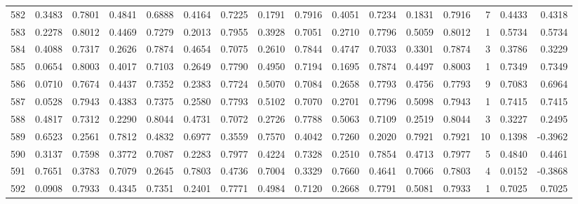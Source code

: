 \begin{tabular}{lrrrrrrrrrrrrrrr}
582 &      0.3483 &  0.7801 &  0.4841 &  0.6888 &  0.4164 &  0.7225 &  0.1791 &  0.7916 &  0.4051 &  0.7234 &   0.1831 &     0.7916 &      7 &                    0.4433 &                     0.4318 \\
583 &      0.2278 &  0.8012 &  0.4469 &  0.7279 &  0.2013 &  0.7955 &  0.3928 &  0.7051 &  0.2710 &  0.7796 &   0.5059 &     0.8012 &      1 &                    0.5734 &                     0.5734 \\
584 &      0.4088 &  0.7317 &  0.2626 &  0.7874 &  0.4654 &  0.7075 &  0.2610 &  0.7844 &  0.4747 &  0.7033 &   0.3301 &     0.7874 &      3 &                    0.3786 &                     0.3229 \\
585 &      0.0654 &  0.8003 &  0.4017 &  0.7103 &  0.2649 &  0.7790 &  0.4950 &  0.7194 &  0.1695 &  0.7874 &   0.4497 &     0.8003 &      1 &                    0.7349 &                     0.7349 \\
586 &      0.0710 &  0.7674 &  0.4437 &  0.7352 &  0.2383 &  0.7724 &  0.5070 &  0.7084 &  0.2658 &  0.7793 &   0.4756 &     0.7793 &      9 &                    0.7083 &                     0.6964 \\
587 &      0.0528 &  0.7943 &  0.4383 &  0.7375 &  0.2580 &  0.7793 &  0.5102 &  0.7070 &  0.2701 &  0.7796 &   0.5098 &     0.7943 &      1 &                    0.7415 &                     0.7415 \\
588 &      0.4817 &  0.7312 &  0.2290 &  0.8044 &  0.4731 &  0.7072 &  0.2726 &  0.7788 &  0.5063 &  0.7109 &   0.2519 &     0.8044 &      3 &                    0.3227 &                     0.2495 \\
589 &      0.6523 &  0.2561 &  0.7812 &  0.4832 &  0.6977 &  0.3559 &  0.7570 &  0.4042 &  0.7260 &  0.2020 &   0.7921 &     0.7921 &     10 &                    0.1398 &                    -0.3962 \\
590 &      0.3137 &  0.7598 &  0.3772 &  0.7087 &  0.2283 &  0.7977 &  0.4224 &  0.7328 &  0.2510 &  0.7854 &   0.4713 &     0.7977 &      5 &                    0.4840 &                     0.4461 \\
591 &      0.7651 &  0.3783 &  0.7079 &  0.2645 &  0.7803 &  0.4736 &  0.7004 &  0.3329 &  0.7660 &  0.4641 &   0.7066 &     0.7803 &      4 &                    0.0152 &                    -0.3868 \\
592 &      0.0908 &  0.7933 &  0.4345 &  0.7351 &  0.2401 &  0.7771 &  0.4984 &  0.7120 &  0.2668 &  0.7791 &   0.5081 &     0.7933 &      1 &                    0.7025 &                     0.7025 \\

\end{tabular}
